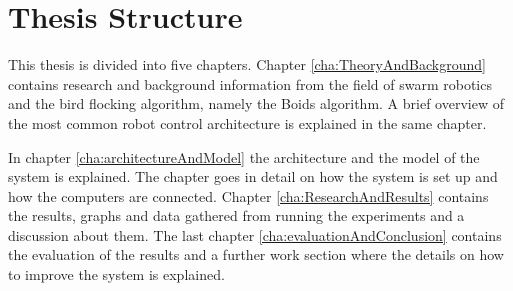 
\section{Thesis Structure}
\label{sec:thesisStructure}
This thesis is divided into five chapters. Chapter \ref{cha:TheoryAndBackground} contains research and background information from the field of swarm robotics and the bird flocking algorithm, namely the Boids algorithm. A brief overview of the most common robot control architecture is explained in the same chapter.

In chapter \ref{cha:architectureAndModel} the architecture and the model of the system is explained. The chapter goes in detail on how the system is set up and how the computers are connected.
Chapter \ref{cha:ResearchAndResults} contains the results, graphs and data gathered from running the experiments and a discussion about them. The last chapter \ref{cha:evaluationAndConclusion} contains the evaluation of the results and a further work section where the details on how to improve the system is explained.

